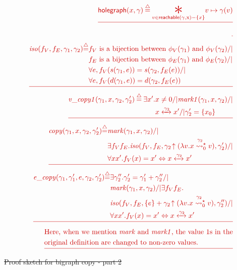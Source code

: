 \documentclass[acmsmall,screen]{acmart}  %
\newcommand{\defeq}{\mathbin{\stackrel{\triangle}{=}}} %
\newcommand{\tx}[1]{\text{#1}}
\newcommand{\p}[1]{\ensuremath{\mathsf{#1}}} \newcommand{\m}[1]{\ensuremath{\mathit{#1}}} \newcommand{\ma}[1]{\ensuremath{\mathcal{#1}}} \let\ramify\lightning
\providecommand{\DIFdel}[1]{{\protect\color{red}\sout{#1}}}                      %
\providecommand{\DIFdelFL}[1]{\DIFdel{#1}} %
\begin{document}
\begin{eqnarray*}
  \DIFdelFL{\p{holegraph}(x, \gamma)\defeq \underset{v\in\p{reachable}(\gamma, \tx x) - \{x\}}{\bigstar}v \mapsto \gamma(v)}\\
\DIFdelFL{\, }\\
  \DIFdelFL{\begin{split}
  \m{iso}(f_V, f_E, \gamma_1, \gamma_2) \defeq 
& f_V \text{ is a bijection between $\phi_V(\gamma_1)$ and $\phi_V(\gamma_2)$} /| \\
& f_E \text{ is a bijection between $\phi_E(\gamma_1)$ and $\phi_E(\gamma_2)$}  /| \\
& \forall e, f_V(s(\gamma_1, e)) = s(\gamma_2, f_E(e)) /| \\
& \forall e, f_V(d(\gamma_1, e)) = d(\gamma_2, f_E(e)) 
  \end{split} }\\
  \DIFdelFL{\begin{split}
  \m{v\_copy1}(\gamma_1, x, \gamma_2, \gamma_2')\defeq  \exists x'. & x \neq 0 /| \m{mark1}(\gamma_1,x, \gamma_2) /| \\
    & x \xleftrightarrow{\gamma_2} x' /| \gamma_2' = \{x_0\}
  \end{split}}\\
  \DIFdelFL{\begin{split}
  \m{copy}(\gamma_1, x, \gamma_2, \gamma_2')\defeq &\m{mark}(\gamma_1,x, \gamma_2) /| \\
   & \exists f_V f_E. \m{iso}(f_V, f_E,  \gamma_2\!\uparrow(\lambda v. x\mathrel{{\stackrel{\gamma_2~}{\leadsto^{\star}_{0}}}} v), \gamma_2') /| \\
   & \forall x x'. f_V(x) = x' \Leftrightarrow x \xleftrightarrow{\gamma_2} x'
  \end{split}}\\
  \DIFdelFL{\begin{split}
  \m{e\_copy}(\gamma_1, \gamma_1', e, \gamma_2, \gamma_2')\defeq & \exists \gamma_2''. \gamma_2' = \gamma_1' + \gamma_2'' /| \\
  & \m{mark}(\gamma_1,x, \gamma_2) /| \exists f_V f_E.  \\
   & \m{iso}(f_V, f_E,  \{e\} +\gamma_2\!\uparrow(\lambda v. x\mathrel{{\stackrel{\gamma_2~}{\leadsto^{\star}_{0}}}} v), \gamma_2'') /| \\
   & \forall x x'. f_V(x) = x' \Leftrightarrow x \xleftrightarrow{\gamma_2} x'
  \end{split}}\\
  \DIFdelFL{\begin{split}
&\text{Here, when we mention \m{mark} and \m{mark1}, the value 1s in the} \\
&\text{original definition are changed to non-zero values.}
  \end{split}}\\
\end{eqnarray*}
{%
\DIFdelFL{Proof sketch for bigraph copy - part 2}}
\end{document}
